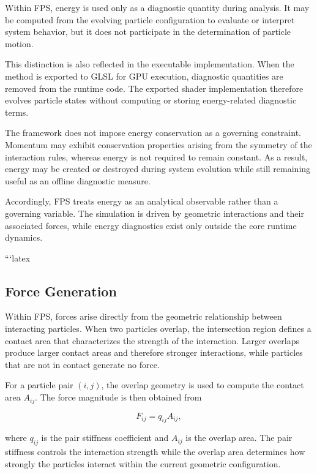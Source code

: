 Within FPS, energy is used only as a diagnostic quantity
during analysis. It may be computed from the evolving
particle configuration to evaluate or interpret system
behavior, but it does not participate in the determination
of particle motion.

This distinction is also reflected in the executable
implementation. When the method is exported to GLSL for
GPU execution, diagnostic quantities are removed from the
runtime code. The exported shader implementation therefore
evolves particle states without computing or storing
energy-related diagnostic terms.

The framework does not impose energy conservation as a
governing constraint. Momentum may exhibit conservation
properties arising from the symmetry of the interaction
rules, whereas energy is not required to remain constant.
As a result, energy may be created or destroyed during
system evolution while still remaining useful as an
offline diagnostic measure.

Accordingly, FPS treats energy as an analytical observable
rather than a governing variable. The simulation is driven
by geometric interactions and their associated forces,
while energy diagnostics exist only outside the core
runtime dynamics.

```latex
\subsection{Force Generation}

Within FPS, forces arise directly from the geometric
relationship between interacting particles. When two
particles overlap, the intersection region defines a
contact area that characterizes the strength of the
interaction. Larger overlaps produce larger contact
areas and therefore stronger interactions, while
particles that are not in contact generate no force.

For a particle pair $(i,j)$, the overlap geometry is
used to compute the contact area $A_{ij}$. The force
magnitude is then obtained from

\begin{equation}
F_{ij}=q_{ij}A_{ij},
\end{equation}

where $q_{ij}$ is the pair stiffness coefficient and
$A_{ij}$ is the overlap area. The pair stiffness
controls the interaction strength while the overlap
area determines how strongly the particles interact
within the current geometric configuration.

